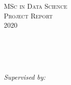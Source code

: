 \documentclass[
11pt, %
oneside, %
english, %
onehalfspacing,
headsepline, %
consistentlayout, %
reqno, %
]{MastersDoctoralThesis} %
\author{Daniel Sikar} %
\begin{document}
\frontmatter %

\pagestyle{plain} %


\begin{titlepage}
\begin{center}

\vspace*{.06\textheight}
{\scshape\LARGE \univname\par}\vspace{1.5cm} %
\textsc{\Large MSc in Data Science}\\[0.5cm] %
\textsc{\Large Project Report}\\[0.5cm]
\textsc{\Large 2020}\\[0.5cm]

\HRule \\[0.4cm] %
{\huge \bfseries \ttitle\par}\vspace{0.4cm} %
\HRule \\[3.5cm] %
 
\begin{flushleft} \large
\authorname \\ [1cm]

\emph{Supervised by:} 
\supname \\ [3.5cm] %
\end{flushleft}
 

 


\end{center}
\end{titlepage}
\end{document}
